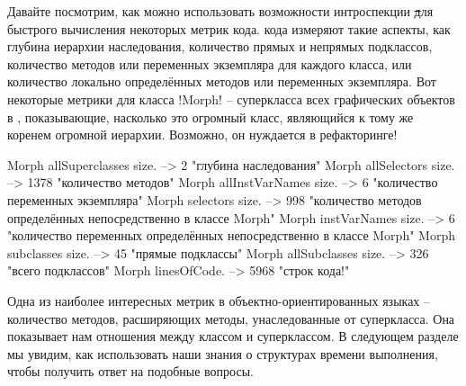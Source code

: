 \documentclass[a4paper,10pt,twoside]{book}
\begin{document}
Давайте посмотрим, как можно использовать возможности интроспекции \st для быстрого вычисления некоторых метрик кода.
 кода измеряют такие аспекты, как глубина иерархии наследования, количество прямых и непрямых подклассов, количество методов или переменных экземпляра для каждого класса, или количество локально определённых методов или переменных экземпляра.
Вот некоторые метрики для класса \ct!Morph! -- суперкласса всех графических объектов в \pharo, показывающие, насколько это огромный класс, являющийся к тому же коренем огромной иерархии. Возможно, он нуждается в рефакторинге!

\begin{code}{}
Morph allSuperclasses size.  -->       2 "глубина наследования"
Morph allSelectors size.        --> 1378 "количество методов"
Morph allInstVarNames size. -->      6 "количество переменных экземпляра"
Morph selectors size.             -->  998 "количество методов определённых непосредственно в классе Morph"
Morph instVarNames size.     -->      6 "количество переменных определённых непосредственно в классе Morph"
Morph subclasses size.          -->    45 "прямые подклассы"
Morph allSubclasses size.      -->  326 "всего подклассов"
Morph linesOfCode.               --> 5968 "строк кода!"
\end{code}

Одна из наиболее интересных метрик в объектно-ориентированных языках -- количество методов, расширяющих методы, унаследованные от суперкласса. 
Она показывает нам отношения между классом и суперклассом.
В следующем разделе мы увидим, как использовать наши знания о структурах времени выполнения, чтобы получить ответ на подобные вопросы.
\end{document}
